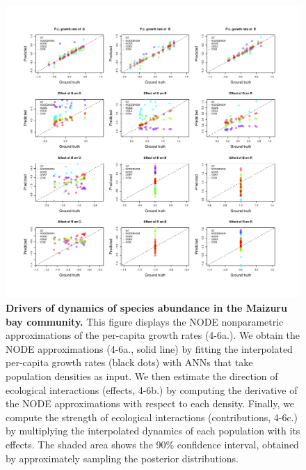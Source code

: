 \documentclass[11pt, oneside]{article}
\begin{document}
\begin{figure}[H]
\includegraphics[width=1\linewidth,page=28]{figures/figures_supplementary.pdf}
\caption{
    \textbf{Drivers of dynamics of species abundance in the Maizuru bay community.}
    This figure displays the NODE nonparametric approximations of the per-capita growth rates (4-6a.). 
    We obtain the NODE approximations (4-6a., solid line) by fitting the interpolated per-capita growth rates (black dots) with ANNs that take population densities as input. 
    We then estimate the direction of ecological interactions (effects, 4-6b.) by computing the derivative of the NODE approximations with respect to each density. 
    Finally, we compute the strength of ecological interactions (contributions, 4-6c.) by multiplying the interpolated dynamics of each population with its effects. 
    The shaded area shows the 90\% confidence interval, obtained by approximately sampling the posterior distributions.
}
\end{figure}
\newpage
\end{document}
